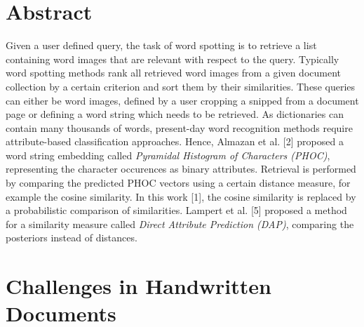 \documentclass[a0,portrait]{a0poster}
\providecommand{\postersection}[1]{
\color{tucol2}
\section*{\sf \huge #1}\Large\sf
\color{Black}
}
\begin{document}
\begin{multicols}{2}

\postersection{Abstract}
\vspace*{-15mm}
\noindent
Given a user defined query, the task of word spotting is to retrieve a list containing word images that are relevant 
with respect to the query. Typically word spotting methods rank all retrieved word images from a given document 
collection by a certain criterion and sort them by their similarities. These queries can either be word images, 
defined by a user cropping a snipped from a document page or defining a word string which needs to be retrieved. 
As dictionaries can contain many thousands of words, present-day word recognition methods require attribute-based 
classification approaches. Hence, Almazan et al. [2] proposed a word string embedding called 
\emph{Pyramidal Histogram of Characters (PHOC)}, representing the character occurences as binary attributes. 
Retrieval is performed by comparing the predicted PHOC vectors using a certain distance measure, for example 
the cosine similarity. In this work [1], the cosine similarity is replaced by a probabilistic comparison of similarities. 
Lampert et al. [5] proposed a method for a similarity measure called \emph{Direct Attribute Prediction (DAP)}, 
comparing the posteriors instead of distances. 


\columnbreak
%
\postersection{Challenges in Handwritten Documents}
\vspace*{-20mm}
%
\end{multicols}
\end{document}
